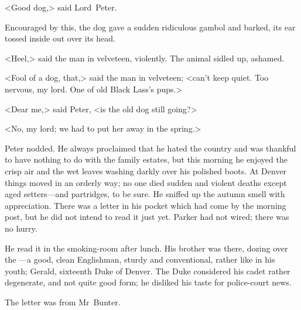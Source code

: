 <Good dog,> said Lord~Peter.

Encouraged by this, the dog gave a sudden ridiculous gambol and barked, its ear tossed inside out over its head.

<Heel,> said the man in velveteen, violently. The animal sidled up, ashamed.

<Fool of a dog, that,> said the man in velveteen; <can't keep quiet. Too nervous, my lord. One of old Black Lass's pups.>

<Dear me,> said Peter, <is the old dog still going?>

<No, my lord; we had to put her away in the spring.>

Peter nodded. He always proclaimed that he hated the country and was thankful to have nothing to do with the family estates, but this morning he enjoyed the crisp air and the wet leaves washing darkly over his polished boots. At Denver things moved in an orderly way; no one died sudden and violent deaths except aged setters—and partridges, to be sure. He sniffed up the autumn smell with appreciation. There was a letter in his pocket which had come by the morning post, but he did not intend to read it just yet. Parker had not wired; there was no hurry.

He read it in the smoking-room after lunch. His brother was there, dozing over the —a good, clean Englishman, sturdy and conventional, rather like  in his youth; Gerald, sixteenth Duke of Denver. The Duke considered his cadet rather degenerate, and not quite good form; he disliked his taste for police-court news.

The letter was from Mr~Bunter.

\clearpage


